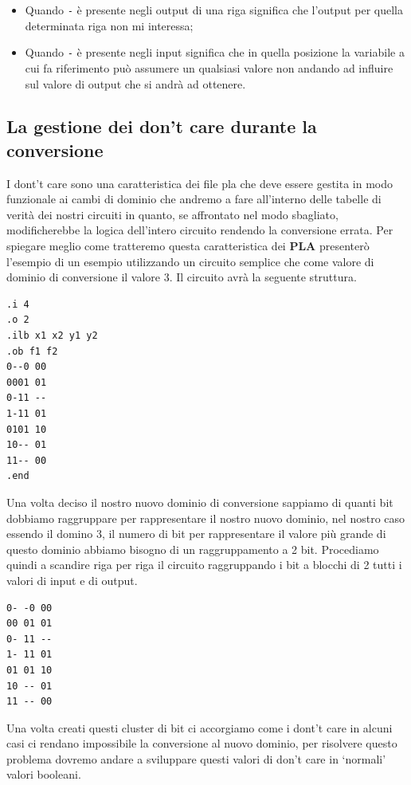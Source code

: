 \documentclass[
  italian,
]{book}
\providecommand{\tightlist}{%
  \setlength{\itemsep}{0pt}\setlength{\parskip}{0pt}}
\begin{document}
\begin{itemize}
\tightlist
\item
  Quando \texttt{-} è presente negli output di una riga significa che l'output per quella determinata riga non mi interessa;
\item
  Quando \texttt{-} è presente negli input significa che in quella posizione la variabile a cui fa riferimento può assumere un qualsiasi valore non andando ad influire sul valore di output che si andrà ad ottenere.
\end{itemize}

\newpage

\hypertarget{la-gestione-dei-dont-care-durante-la-conversione}{%
\subsection{La gestione dei don't care durante la conversione}\label{la-gestione-dei-dont-care-durante-la-conversione}}

I dont't care sono una caratteristica dei file pla che deve essere gestita in modo funzionale ai cambi di dominio che andremo a fare all'interno delle tabelle di verità dei nostri circuiti in quanto, se affrontato nel modo sbagliato, modificherebbe la logica dell'intero circuito rendendo la conversione errata. Per spiegare meglio come tratteremo questa caratteristica dei \textbf{PLA} presenterò l'esempio di un esempio utilizzando un circuito semplice che come valore di dominio di conversione il valore 3. Il circuito avrà la seguente struttura.

\begin{verbatim}
.i 4
.o 2
.ilb x1 x2 y1 y2
.ob f1 f2
0--0 00    
0001 01
0-11 --
1-11 01
0101 10
10-- 01
11-- 00
.end
\end{verbatim}

Una volta deciso il nostro nuovo dominio di conversione sappiamo di quanti bit dobbiamo raggruppare per rappresentare il nostro nuovo dominio, nel nostro caso essendo il domino 3, il numero di bit per rappresentare il valore più grande di questo dominio abbiamo bisogno di un raggruppamento a 2 bit. Procediamo quindi a scandire riga per riga il circuito raggruppando i bit a blocchi di 2 tutti i valori di input e di output.

\begin{verbatim}
0- -0 00    
00 01 01
0- 11 --
1- 11 01
01 01 10
10 -- 01
11 -- 00
\end{verbatim}

Una volta creati questi cluster di bit ci accorgiamo come i dont't care in alcuni casi ci rendano impossibile la conversione al nuovo dominio, per risolvere questo problema dovremo andare a sviluppare questi valori di don't care in `normali' valori booleani.
\end{document}
